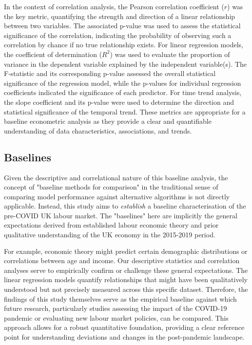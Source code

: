 \documentclass[11pt,a4paper]{article}
\begin{document}
In the context of correlation analysis, the Pearson correlation coefficient ($r$) was the key metric, quantifying the strength and direction of a linear relationship between two variables. The associated p-value was used to assess the statistical significance of the correlation, indicating the probability of observing such a correlation by chance if no true relationship exists. For linear regression models, the coefficient of determination ($R^2$) was used to evaluate the proportion of variance in the dependent variable explained by the independent variable(s). The F-statistic and its corresponding p-value assessed the overall statistical significance of the regression model, while the p-values for individual regression coefficients indicated the significance of each predictor. For time trend analysis, the slope coefficient and its p-value were used to determine the direction and statistical significance of the temporal trend. These metrics are appropriate for a baseline econometric analysis as they provide a clear and quantifiable understanding of data characteristics, associations, and trends.

\subsection{Baselines}

Given the descriptive and correlational nature of this baseline analysis, the concept of "baseline methods for comparison" in the traditional sense of comparing model performance against alternative algorithms is not directly applicable. Instead, this study aims to \textit{establish} a baseline characterisation of the pre-COVID UK labour market. The "baselines" here are implicitly the general expectations derived from established labour economic theory and prior qualitative understanding of the UK economy in the 2015-2019 period.

For example, economic theory might predict certain demographic distributions or correlations between age and income. Our descriptive statistics and correlation analyses serve to empirically confirm or challenge these general expectations. The linear regression models quantify relationships that might have been qualitatively understood but not precisely measured across this specific dataset. Therefore, the findings of this study themselves serve as the empirical baseline against which future research, particularly studies assessing the impact of the COVID-19 pandemic or evaluating new labour market policies, can be compared. This approach allows for a robust quantitative foundation, providing a clear reference point for understanding deviations and changes in the post-pandemic landscape.
\end{document}

